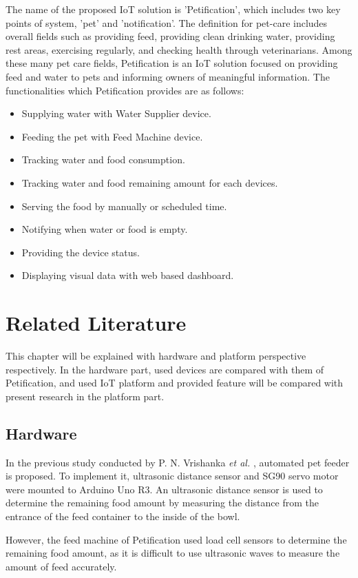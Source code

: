 \documentclass[conference]{IEEEtran}
\begin{document}
The name of the proposed IoT solution is 'Petification', which includes two key points of system, 'pet' and 'notification'. The definition for pet-care includes overall fields such as providing feed, providing clean drinking water, providing rest areas, exercising regularly, and checking health through veterinarians. \cite{b10}  Among these many pet care fields, Petification is an IoT solution focused on providing feed and water to pets and informing owners of meaningful information. The functionalities which Petification provides are as follows:
\begin{itemize}
\item Supplying water with Water Supplier device.
\item Feeding the pet with Feed Machine device.
\item Tracking water and food consumption.
\item Tracking water and food remaining amount for each devices.
\item Serving the food by manually or scheduled time.
\item Notifying when water or food is empty.
\item Providing the device status.
\item Displaying visual data with web based dashboard.
\end{itemize}

\section{Related Literature}
This chapter will be explained with hardware and platform perspective respectively. In the hardware part, used devices are compared with them of Petification, and used IoT platform and provided feature will be compared with present research in the platform part.

\subsection{Hardware}
In the previous study conducted by P. N. Vrishanka \textit{et al.} \cite{b11}, automated pet feeder is proposed. To implement it, ultrasonic distance sensor and SG90 servo motor were mounted to Arduino Uno R3. An ultrasonic distance sensor is used to determine the remaining food amount by measuring the distance from the entrance of the feed container to the inside of the bowl.

However, the feed machine of Petification used load cell sensors to determine the remaining food amount, as it is difficult to use ultrasonic waves to measure the amount of feed accurately.
\end{document}
